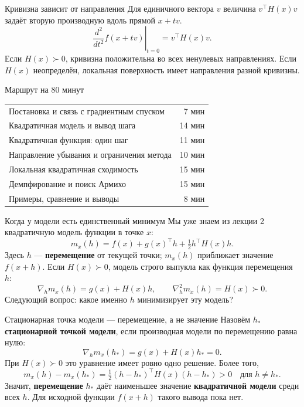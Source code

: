 \documentclass[aspectratio=169,10pt]{beamer}
\begin{document}
\begin{frame}{Кривизна зависит от направления}
\small
Для единичного вектора $v$ величина $v^\top H(x)v$ задаёт вторую производную вдоль прямой $x+tv$.
\[
\left.\frac{d^2}{dt^2}f(x+tv)\right|_{t=0}=v^\top H(x)v.
\]
Если $H(x)\succ0$, кривизна положительна во всех ненулевых направлениях. Если $H(x)$ неопределён, локальная поверхность имеет направления разной кривизны.
\end{frame}

\begin{frame}{Маршрут на 80 минут}
\small
\begin{tabular}{@{}p{.70\linewidth}r@{}}
Постановка и связь с градиентным спуском & 7 мин\\
Квадратичная модель и вывод шага & 14 мин\\
Квадратичная функция: один шаг & 11 мин\\
Направление убывания и ограничения метода & 10 мин\\
Локальная квадратичная сходимость & 15 мин\\
Демпфирование и поиск Армихо & 15 мин\\
Примеры, сравнение и выводы & 8 мин
\end{tabular}
\end{frame}

\begin{frame}{Когда у модели есть единственный минимум}
\small
Мы уже знаем из лекции 2 квадратичную модель функции в точке $x$:
\[
m_x(h)=f(x)+g(x)^\top h+\tfrac12 h^\top H(x)h.
\]
Здесь $h$ --- \textbf{перемещение} от текущей точки; $m_x(h)$ приближает значение $f(x+h)$.
Если $H(x)\succ0$, модель строго выпукла как функция перемещения $h$:
\[
\nabla_h m_x(h)=g(x)+H(x)h,
\qquad \nabla_h^2 m_x(h)=H(x)\succ0.
\]
Следующий вопрос: какое именно $h$ минимизирует эту модель?
\end{frame}

\begin{frame}{Стационарная точка модели --- перемещение, а не значение}
\small
Назовём $h_*$ \textbf{стационарной точкой модели}, если производная модели по перемещению равна нулю:
\[
\nabla_h m_x(h_*)=g(x)+H(x)h_*=0.
\]
При $H(x)\succ0$ это уравнение имеет ровно одно решение. Более того,
\[
m_x(h)-m_x(h_*)=\tfrac12(h-h_*)^\top H(x)(h-h_*)>0
\quad\text{для }h\ne h_*.
\]
Значит, \textbf{перемещение} $h_*$ даёт наименьшее значение \textbf{квадратичной модели} среди всех $h$. Для исходной функции $f(x+h)$ такого вывода пока нет.
\end{frame}
\end{document}
